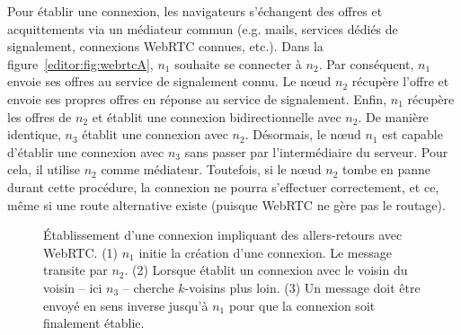 \noindent Pour établir une connexion, les navigateurs s'échangent des offres et
acquittements via un médiateur commun (e.g. mails, services dédiés de
signalement, connexions WebRTC connues, etc.). Dans la
figure~\ref{editor:fig:webrtcA}, $n_1$ souhaite se connecter à $n_2$. Par
conséquent, $n_1$ envoie ses offres au service de signalement connu. Le nœud
$n_2$ récupère l'offre et envoie ses propres offres en réponse au service de
signalement. Enfin, $n_1$ récupère les offres de $n_2$ et établit une connexion
bidirectionnelle avec $n_2$. De manière identique, $n_3$ établit une connexion
avec $n_2$. Désormais, le nœud $n_1$ est capable d'établir une connexion avec
$n_3$ sans passer par l'intermédiaire du serveur. Pour cela, il utilise $n_2$
comme médiateur. Toutefois, si le nœud $n_2$ tombe en panne durant cette
procédure, la connexion ne pourra s'effectuer correctement, et ce, même si une
route alternative existe (puisque WebRTC ne gère pas le routage).

\begin{figure}
  \begin{center}
    
    \caption[Établissement d'une connexion impliquant des allers-retours avec
    WebRTC]{\label{repl:fig:handshake} Établissement d'une connexion impliquant
      des allers-retours avec WebRTC. (1) $n_1$ initie la création d'une
      connexion. Le message transite par $n_2$. (2) Lorsque \CYCLON établit un
      connexion avec le voisin du voisin -- ici $n_3$ -- \SCAMP cherche
      $k$-voisins plus loin. (3) Un message doit être envoyé en sens inverse
      jusqu'à $n_1$ pour que la connexion soit finalement établie.}
  \end{center}
\end{figure}

